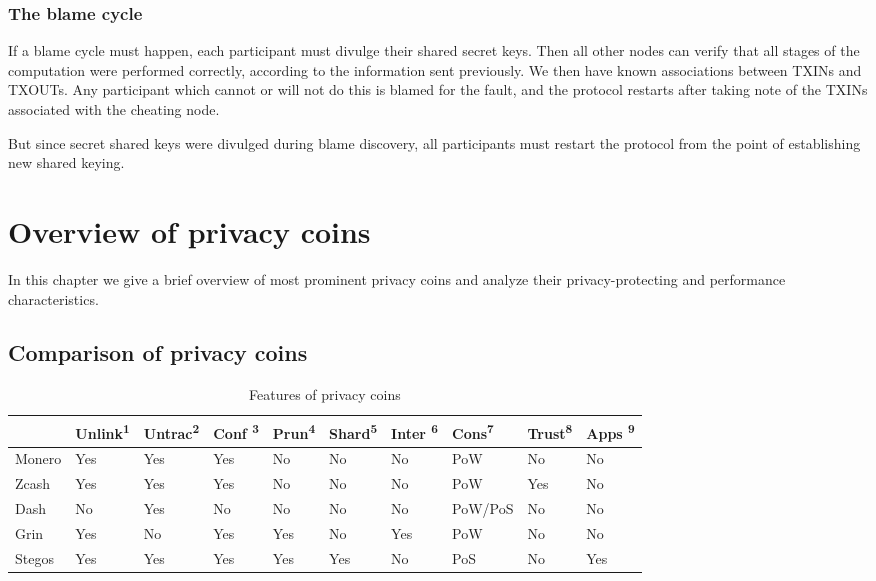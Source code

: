 \documentclass[8pt,fleqn,openany]{book}
\begin{document}
{		\subsection{The blame cycle} 
		If a blame cycle must happen, each participant must divulge their shared secret keys. Then all other nodes can verify that all stages of the computation were performed correctly, according to the information sent previously. We then have known associations between TXINs and TXOUTs. Any participant which cannot or will not do this is blamed for the fault, and the protocol restarts after taking note of the TXINs associated with the cheating node.
		
		But since secret shared keys were divulged during blame discovery, all participants must restart the protocol from the point of establishing new shared keying.
		
		\chapter{Overview of privacy coins}\label{app:privacy-coins}
		
		In this chapter we give a brief overview of most prominent privacy coins and analyze their privacy-protecting and performance characteristics.
		
		\section{Comparison of privacy coins}
		
		\begin{table}[ht!]
			\centering
			\begin{tabular}{llllllllll}
				\toprule[2pt] 
				{} & Unlink\textsuperscript{1}
				& Untrac\textsuperscript{2} & Conf \textsuperscript{3} & Prun\textsuperscript{4} & Shard\textsuperscript{5} & Inter \textsuperscript{6} & Cons\textsuperscript{7} & Trust\textsuperscript{8} & Apps \textsuperscript{9} \\
				\midrule[2pt]
				Monero & Yes & Yes & Yes & No & No & No & PoW & No & No \\
				Zcash  & Yes & Yes & Yes & No  & No & No & PoW & Yes & No \\
				Dash   & No  & Yes & No  & No  & No & No & PoW/PoS & No & No \\
				Grin   & Yes & No  & Yes & Yes & No & Yes & PoW & No & No \\
				Stegos & Yes & Yes & Yes & Yes & Yes & No & PoS & No  & Yes \\
				\bottomrule[2pt]
			\end{tabular}
			\caption{Features of privacy coins} 
		\end{table}
		
}
\end{document}
